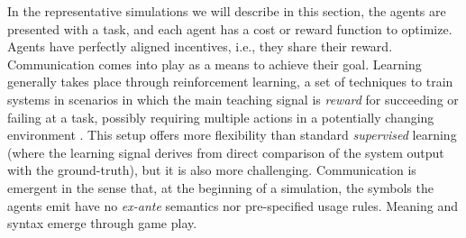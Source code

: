 % 

% 


In the representative simulations we will describe in this section, the agents are presented with a
 task, and each agent has a cost or reward function to optimize.
Agents have perfectly aligned incentives, i.e., they
 share their reward. Communication comes into play as a means to
achieve their goal. Learning generally takes place through %
reinforcement learning, a set of techniques to train systems in scenarios in which the main teaching signal is \emph{reward} for succeeding or failing at a task, possibly requiring multiple actions in a potentially changing environment \cite{Sutton:Barto:1998,Mnih:etal:2015,Silver:etal:2016}. This setup offers more flexibility than standard \emph{supervised} learning (where the learning signal derives from direct comparison of the system output with the ground-truth), but it is also more challenging. Communication is emergent in the sense that, at the beginning of a simulation, the
 symbols the agents emit have no \emph{ex-ante} semantics nor pre-specified usage rules. Meaning and syntax emerge through game play. %

